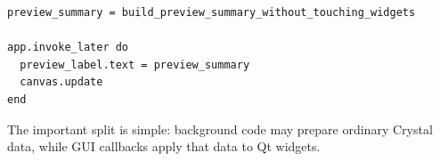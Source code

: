 \begin{lstlisting}[style=crystal]
preview_summary = build_preview_summary_without_touching_widgets

app.invoke_later do
  preview_label.text = preview_summary
  canvas.update
end
\end{lstlisting}

The important split is simple: background code may prepare ordinary Crystal data, while GUI callbacks apply that data to Qt widgets.
